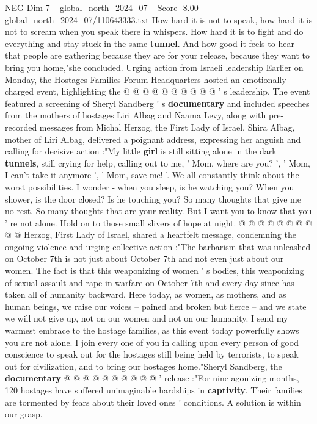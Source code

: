 \begin{textsample}{NEG Dim 7 – global\_north\_2024\_07 – Score -8.00 – global\_north\_2024\_07/110643333.txt}
How hard it is not to speak, how hard it is not to scream when you speak there in whispers.
How hard it is to fight and do everything and stay stuck in the same \textbf{tunnel}.
And how good it feels to hear that people are gathering because they are for your release, because they want to bring you home,"she concluded.
Urging action from Israeli leadership Earlier on Monday, the Hostages Families Forum Headquarters hosted an emotionally charged event, highlighting the @ @ @ @ @ @ @ @ @ @ ' s leadership.
The event featured a screening of Sheryl Sandberg ' s \textbf{documentary} and included speeches from the mothers of hostages Liri Albag and Naama Levy, along with pre-recorded messages from Michal Herzog, the First Lady of Israel.
Shira Albag, mother of Liri Albag, delivered a poignant address, expressing her anguish and calling for decisive action :"My little \textbf{girl} is still sitting alone in the dark \textbf{tunnels}, still crying for help, calling out to me, ' Mom, where are you? ', ' Mom, I can't take it anymore ', ' Mom, save me! '.
We all constantly think about the worst possibilities.
I wonder - when you sleep, is he watching you?
When you shower, is the door closed?
Is he touching you?
So many thoughts that give me no rest.
So many thoughts that are your reality.
But I want you to know that you ' re not alone.
Hold on to those small slivers of hope at night. @ @ @ @ @ @ @ @ @ @ Herzog, First Lady of Israel, shared a heartfelt message, condemning the ongoing violence and urging collective action :"The barbarism that was unleashed on October 7th is not just about October 7th and not even just about our women.
The fact is that this weaponizing of women ' s bodies, this weaponizing of sexual assault and rape in warfare on October 7th and every day since has taken all of humanity backward.
Here today, as women, as mothers, and as human beings, we raise our voices -- pained and broken but fierce -- and we state we will not give up, not on our women and not on our humanity.
I send my warmest embrace to the hostage families, as this event today powerfully shows you are not alone.
I join every one of you in calling upon every person of good conscience to speak out for the hostages still being held by terrorists, to speak out for civilization, and to bring our hostages home."Sheryl Sandberg, the \textbf{documentary} @ @ @ @ @ @ @ @ @ @ ' release :"For nine agonizing months, 120 hostages have suffered unimaginable hardships in \textbf{captivity}.
Their families are tormented by fears about their loved ones ' conditions.
A solution is within our grasp.

\end{textsample}
